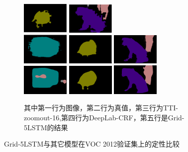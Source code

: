 \begin{figure}
\begin{subfigure}{0.4\textwidth}
		\includegraphics[width=0.25\textwidth]{figures/demo_images/result/compare/zoom_bird.png}
		\includegraphics[width=0.25\textwidth]{figures/demo_images/result/compare/zoom_dog.png} \\
		\includegraphics[width=0.25\textwidth]{figures/demo_images/result/compare/deeplab_bus.png}
		\includegraphics[width=0.25\textwidth]{figures/demo_images/result/compare/deeplab_bird.png}
		\includegraphics[width=0.25\textwidth]{figures/demo_images/result/compare/deeplab_dog.png} \\
		\includegraphics[width=0.25\textwidth]{figures/demo_images/result/compare/my_bus.png}
		\includegraphics[width=0.25\textwidth]{figures/demo_images/result/compare/my_bird.png}
		\includegraphics[width=0.25\textwidth]{figures/demo_images/result/compare/my_dog.png} 
		\caption{\tiny 其中第一行为图像，第二行为真值，第三行为TTI-zoomout-16,第四行为DeepLab-CRF，第五行是Grid-5LSTM的结果}
		\label{fig:compare2}
	\end{subfigure}
	\caption{Grid-5LSTM与其它模型在VOC 2012验证集上的定性比较}
\end{figure}